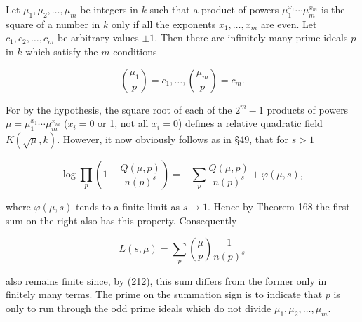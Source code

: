 Let $\mu_1, \mu_2, \ldots, \mu_m$ be integers in $k$ such that a product of powers $\mu_1^{x_1} \cdots \mu_m^{x_m}$ is the square of a number in $k$ only if all the exponents $x_1, \ldots, x_m$ are even. Let $c_1, c_2, \ldots, c_m$ be arbitrary values $\pm 1$. Then there are infinitely many prime ideals $p$ in $k$ which satisfy the $m$ conditions

$$\left( \frac{\mu_1}{p} \right) = c_1, \ldots, \left( \frac{\mu_m}{p} \right) = c_m.$$

For by the hypothesis, the square root of each of the $2^m - 1$ products of powers $\mu = \mu_1^{x_1} \cdots \mu_m^{x_m}$ ($x_i = 0$ or 1, not all $x_i = 0$) defines a relative quadratic field $K(\sqrt{\mu}, k)$. However, it now obviously follows as in §49, that for $s > 1$

$$\log \prod_p \left( 1 - \frac{Q(\mu, p)}{n(p)^s} \right) = -\sum_p \frac{Q(\mu, p)}{n(p)^s} + \varphi(\mu, s),$$

where $\varphi(\mu, s)$ tends to a finite limit as $s \to 1$. Hence by Theorem 168 the first sum on the right also has this property. Consequently

$$L(s, \mu) = \sum_p \left( \frac{\mu}{p} \right) \frac{1}{n(p)^s}$$

also remains finite since, by (212), this sum differs from the former only in finitely many terms. The prime on the summation sign is to indicate that $p$ is only to run through the odd prime ideals which do not divide $\mu_1, \mu_2, \ldots, \mu_m$.
